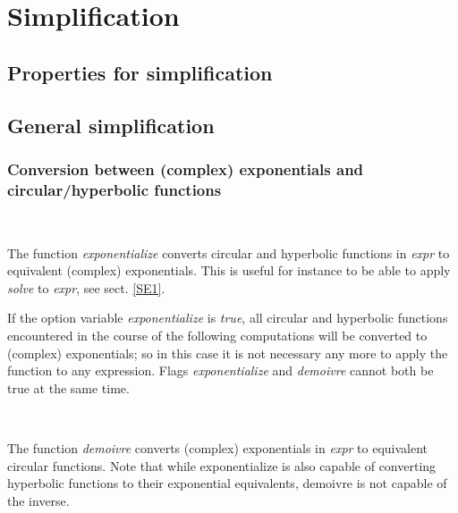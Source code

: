 \documentclass[../Maxima_Workbook.tex]{subfiles}
\begin{document}
	
\chapter{Simplification}

\section{Properties for simplification}

\section{General simplification}

\subsection{Conversion between (complex) exponentials and circular/hyperbolic functions}

\lz {} \hfill \tcr{[function]} \\
 \qquad {} \hfill {}

\lz The function \emph{exponentialize} converts circular and hyperbolic functions in \emph{expr} to equivalent (complex) exponentials. This is useful for instance to be able to apply \emph{solve} to \emph{expr}, see sect. \ref{SE1}.

\lz If the option variable \emph{exponentialize} is \emph{true}, all circular and hyperbolic functions encountered in the course of the following computations will be converted to (complex) exponentials; so in this case it is not necessary any more to apply the function to any expression.  Flags \emph{exponentialize} and \emph{demoivre} cannot both be true at the same time.

\lz {} \hfill \tcr{[function]} \\
 \qquad {} \hfill {}

\lz The function \emph{demoivre} converts (complex) exponentials in \emph{expr} to equivalent circular functions. Note that while exponentialize is also capable of converting hyperbolic functions to their exponential equivalents, demoivre is not capable of the inverse.
\end{document}
